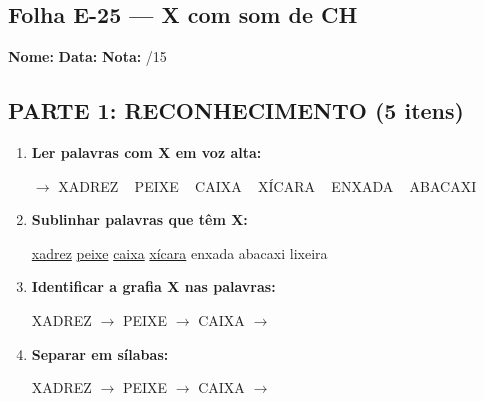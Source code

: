 \subsection{Folha E-25 --- X com som de CH}
\begin{exercicio}



\noindent\textbf{Nome:} \underline{\hspace{3.2cm}} \quad \textbf{Data:} \underline{\hspace{1.6cm}} \quad \textbf{Nota:} \underline{\hspace{0.9cm}}/15


\subsection*{PARTE 1: RECONHECIMENTO (5 itens)}

\begin{enumerate}

  \item \textbf{Ler palavras com X em voz alta:}
  \begin{center}
  $\rightarrow$ XADREZ ~ PEIXE ~ CAIXA ~ XÍCARA ~ ENXADA ~ ABACAXI
  \end{center}

  \item \textbf{Sublinhar palavras que têm X:}

\begin{center}
  \uline{xadrez} \quad \uline{peixe} \quad \uline{caixa} \quad \uline{xícara} \quad enxada \quad abacaxi \quad lixeira
\end{center}

  \item \textbf{Identificar a grafia X nas palavras:}
  \begin{center}
  XADREZ $\rightarrow$ \underline{\hspace{1cm}} \quad PEIXE $\rightarrow$ \underline{\hspace{1cm}} \quad CAIXA $\rightarrow$ \underline{\hspace{1cm}}
  \end{center}

  \item \textbf{Separar em sílabas:}
  \begin{center}
  XADREZ $\rightarrow$ \underline{\hspace{1.2cm}} \quad PEIXE $\rightarrow$ \underline{\hspace{1.2cm}} \quad CAIXA $\rightarrow$ \underline{\hspace{1.2cm}}
  \end{center}


\end{enumerate}
\end{exercicio}
